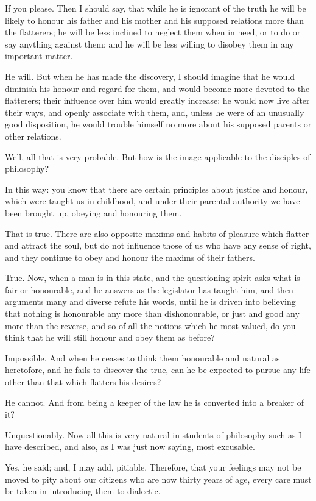 If you please.
Then I should say, that while he is ignorant of the truth he will be likely to honour his father and his mother and his supposed relations more than the flatterers; he will be less inclined to neglect them when in need, or to do or say anything against them; and he will be less willing to disobey them in any important matter.

He will.
But when he has made the discovery, I should imagine that he would diminish his honour and regard for them, and would become more devoted to the flatterers; their influence over him would greatly increase; he would now live after their ways, and openly associate with them, and, unless he were of an unusually good disposition, he would trouble himself no more about his supposed parents or other relations.

Well, all that is very probable. But how is the image applicable to the disciples of philosophy?

In this way: you know that there are certain principles about justice and honour, which were taught us in childhood, and under their parental authority we have been brought up, obeying and honouring them.

That is true.
There are also opposite maxims and habits of pleasure which flatter and attract the soul, but do not influence those of us who have any sense of right, and they continue to obey and honour the maxims of their fathers.

True.
Now, when a man is in this state, and the questioning spirit asks what is fair or honourable, and he answers as the legislator has taught him, and then arguments many and diverse refute his words, until he is driven into believing that nothing is honourable any more than dishonourable, or just and good any more than the reverse, and so of all the notions which he most valued, do you think that he will still honour and obey them as before?

Impossible.
And when he ceases to think them honourable and natural as heretofore, and he fails to discover the true, can he be expected to pursue any life other than that which flatters his desires?

He cannot.
And from being a keeper of the law he is converted into a breaker of it?

Unquestionably.
Now all this is very natural in students of philosophy such as I have described, and also, as I was just now saying, most excusable.

Yes, he said; and, I may add, pitiable.
Therefore, that your feelings may not be moved to pity about our citizens who are now thirty years of age, every care must be taken in introducing them to dialectic.

